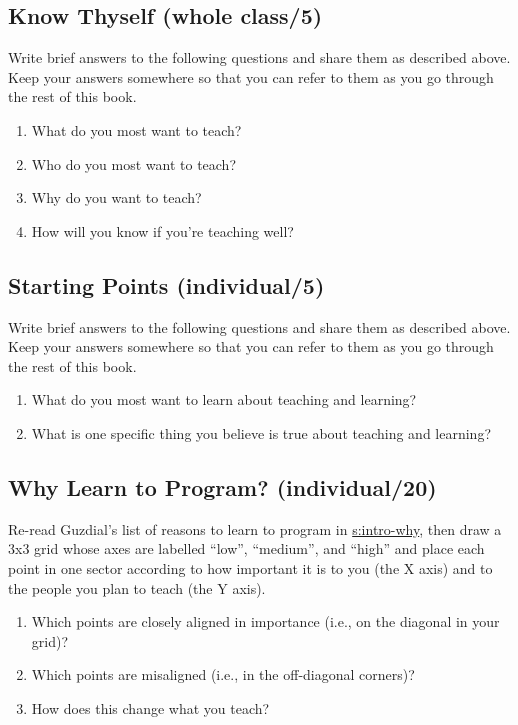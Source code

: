 \subsection{Know Thyself (whole class/5)}\label{know-thyself-whole-class5}

Write brief answers to the following questions and share them as
described above. Keep your answers somewhere so that you can refer to
them as you go through the rest of this book.

\begin{enumerate}
\item
  What do you most want to teach?
\item
  Who do you most want to teach?
\item
  Why do you want to teach?
\item
  How will you know if you're teaching well?
\end{enumerate}

\subsection{Starting Points (individual/5)}\label{starting-points-individual5}

Write brief answers to the following questions and share them as
described above. Keep your answers somewhere so that you can refer to
them as you go through the rest of this book.

\begin{enumerate}
\item
  What do you most want to learn about teaching and learning?
\item
  What is one specific thing you believe is true about teaching and
  learning?
\end{enumerate}

\subsection{Why Learn to Program? (individual/20)}\label{why-learn-to-program-individual20}

Re-read Guzdial's list of reasons to learn to program in
\protect\hyperlink{SECTION}{s:intro-why}, then draw a 3x3 grid whose axes are labelled
``low'', ``medium'', and ``high'' and place each point in one sector
according to how important it is to you (the X axis) and to the people
you plan to teach (the Y axis).

\begin{enumerate}
\item
  Which points are closely aligned in importance (i.e., on the
  diagonal in your grid)?
\item
  Which points are misaligned (i.e., in the off-diagonal corners)?
\item
  How does this change what you teach?
\end{enumerate}

